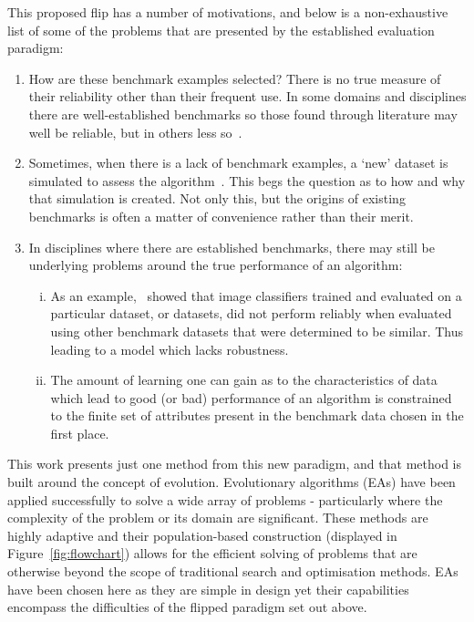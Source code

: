 
This proposed flip has a number of motivations, and below is a non-exhaustive
list of some of the problems that are presented by the established evaluation
paradigm:
\begin{enumerate}
    \item How are these benchmark examples selected? There is no true measure of
        their reliability other than their frequent use. In some domains and
        disciplines there are well-established benchmarks so those found through
        literature may well be reliable, but in others less
        so~\cite{Campos2016,UCRArchive2018,Wang2015}.
    \item Sometimes, when there is a lack of benchmark examples, a `new' dataset
        is simulated to assess the algorithm~\cite{Olson2017}. This begs the
        question as to how and why that simulation is created. Not only this,
        but the origins of existing benchmarks is often a matter of convenience
        rather than their merit.
    \item In disciplines where there are established benchmarks, there may still
        be underlying problems around the true performance of an algorithm:
        \begin{enumerate}[(i)]
            \item As an example, \cite{Torralba2011}~showed that image
                classifiers trained and evaluated on a particular dataset, or
                datasets, did not perform reliably when evaluated using other
                benchmark datasets that were determined to be similar. Thus
                leading to a model which lacks robustness.
            \item The amount of learning one can gain as to the characteristics
                of data which lead to good (or bad) performance of an algorithm
                is constrained to the finite set of attributes present in the
                benchmark data chosen in the first place.
        \end{enumerate}
\end{enumerate}

This work presents just one method from this new paradigm, and that method is
built around the concept of evolution. Evolutionary algorithms (EAs) have been
applied successfully to solve a wide array of problems \-- particularly where
the complexity of the problem or its domain are significant. These methods are
highly adaptive and their population-based construction (displayed in
Figure~\ref{fig:flowchart}) allows for the efficient solving of problems that
are otherwise beyond the scope of traditional search and optimisation methods.
EAs have been chosen here as they are simple in design yet their capabilities
encompass the difficulties of the flipped paradigm set out above.

